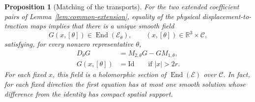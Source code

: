 \documentclass[11pt]{article}
\newcommand{\R}{\mathbb R}
\newcommand{\Id}{\mathrm{Id}}
\newcommand{\Ecal}{\mathcal E}
\newtheorem{proposition}[theorem]{Proposition}
\theoremstyle{remark}
\numberwithin{equation}{section}
\begin{document}
\begin{proposition}[Matching of the transports]\label{prop:transport-matching}
For the two extended coefficient pairs of
Lemma~\ref{lem:common-extension}, equality of the physical
displacement-to-traction maps implies that there is a unique smooth
field
\[
 G(x,[\theta])\in\operatorname{End}(\Ecal_\theta),
 \qquad (x,[\theta])\in\R^3\times\mathcal C,
\]
satisfying, for every nonzero representative $\theta$,
\begin{equation}\label{eq:comparison-transport}
 \begin{aligned}
 D_\theta G&=M_{2,\theta}G-GM_{1,\theta},\\
 G(x,[\theta])&=\Id\qquad\text{if }|x|>2r.
 \end{aligned}
\end{equation}
For each fixed $x$, this field is a holomorphic section of
$\operatorname{End}(\Ecal)$ over $\mathcal C$. In fact, for each
fixed direction the first equation has at most one smooth solution whose
difference from the identity has compact spatial support.
\end{proposition}
\end{document}
